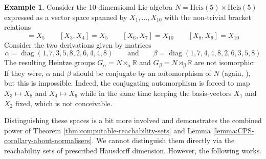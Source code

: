\documentclass[a4paper,12pt]{amsart}
\newcommand{\pp}{\mathrm}
\DeclareMathOperator{\diag}{diag}
\theoremstyle{plain}
\theoremstyle{definition}
\newtheorem{Esim}[maar]{Example}
\theoremstyle{plain}
\theoremstyle{remark}
\begin{document}
\begin{Esim} \label{esim:HeistimesHeis}
	Consider the 10-dimensional Lie algebra \( N = \pp{Heis}(5) \times \pp{Heis}(5) \) expressed as a vector space spanned by \( X_1,\ldots,X_{10} \) with the non-trivial bracket relations
	\begin{equation*}
	[X_1,X_2] = X_5 \qquad [X_3,X_4] = X_5 \qquad [X_6,X_7] = X_{10} \qquad [X_8,X_9] = X_{10}
	\end{equation*}
	Consider the two derivations given by matrices
	\begin{equation*}
	\alpha = \diag(1,7,3,5,8,2,6,4,4,8)
	\qquad \text{and} \qquad
	\beta = \diag(1,7,4,4,8,2,6,3,5,8)
	\end{equation*}
	The resulting Heintze groups \( G_\alpha = N \rtimes_\alpha \mathbb{R} \) and \( G_\beta = N \rtimes_\beta \mathbb{R} \) are not isomorphic: If they were, \( \alpha \) and \(\beta\) should be conjugate by an automorphism of \( N \) (again, \cite[Proposition 4.7]{hakavuori2020gradings}), but this is impossible. 
	Indeed, the conjugating automorphism is forced to 
	map \( X_3 \mapsto X_8 \) and \( X_4 \mapsto X_9 \)
	while in the same time keeping the basis-vectors \( X_1 \) and \(X_2\)
	fixed, which is not conceivable. 
	
	Distinguishing these spaces is a bit more involved and demonstrates the combined power of Theorem \ref{thm:computable-reachability-sets} and Lemma \ref{lemma:CPS-corollary-about-normalisers}. We cannot distinguish them directly via the reachability sets of prescribed Hausdorff dimension. However, the following works.
	

\end{Esim}
\end{document}
